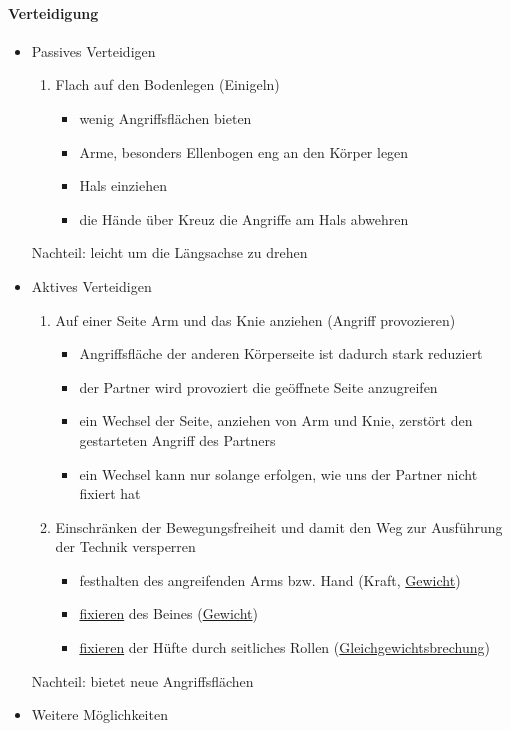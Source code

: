 \documentclass[justified, a4paper, notitlepage, captions=tableheading, nobib]{tufte-handout}
\begin{document}
\paragraph{Verteidigung}
\label{sec:org16da402}
\begin{itemize}
\item Passives Verteidigen 
\begin{enumerate}
\item Flach auf den Bodenlegen (Einigeln)
\begin{itemize}
\item wenig Angriffsflächen bieten
\item Arme, besonders Ellenbogen eng an den Körper legen
\item Hals einziehen
\item die Hände über Kreuz die Angriffe am Hals abwehren
\end{itemize}
\end{enumerate}
Nachteil: leicht um die Längsachse zu drehen
\item Aktives Verteidigen
\begin{enumerate}
\item Auf einer Seite Arm und das Knie anziehen (Angriff provozieren)
\begin{itemize}
\item Angriffsfläche der anderen Körperseite ist dadurch stark reduziert
\item der Partner wird provoziert die geöffnete Seite anzugreifen
\item ein Wechsel der Seite, anziehen von Arm und Knie, zerstört den gestarteten Angriff des Partners
\item ein Wechsel kann nur solange erfolgen, wie uns der Partner nicht fixiert hat
\end{itemize}
\item Einschränken der Bewegungsfreiheit und damit den Weg zur Ausführung der Technik versperren
\begin{itemize}
\item festhalten des angreifenden Arms bzw. Hand (Kraft, \hyperref[org889513a]{Gewicht})
\item \hyperref[org62822f6]{fixieren} des Beines (\hyperref[org889513a]{Gewicht})
\item \hyperref[org62822f6]{fixieren} der Hüfte durch seitliches Rollen (\hyperref[orgc1d00b8]{Gleichgewichtsbrechung})
\end{itemize}
\end{enumerate}
Nachteil: bietet neue Angriffsflächen
\item Weitere Möglichkeiten

\end{itemize}
\end{document}
